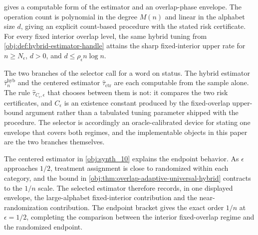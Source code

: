  gives a computable form of the estimator and an overlap-phase envelope. The operation count is polynomial in the degree \(M(n)\) and linear in the alphabet size \(d\), giving an explicit count-based procedure with the stated risk certificate. For every fixed interior overlap level, the same hybrid tuning from \cref{obj:def:hybrid-estimator-handle} attains the sharp fixed-interior upper rate for \(n\ge N_\epsilon\), \(d>0\), and \(d\le\rho_\epsilon n\log n\).

The two branches of the selector call for a word on status. The hybrid estimator \(\widehat\tau_n^{\mathrm{hyb}}\) and the centered estimator \(\widehat\tau_{\mathrm{ctr}}\) are each computable from the sample alone. The rule \(\widehat\tau_{C_\epsilon,\epsilon}\) that chooses between them is not: it compares the two risk certificates, and \(C_\epsilon\) is an existence constant produced by the fixed-overlap upper-bound argument rather than a tabulated tuning parameter shipped with the procedure. The selector is accordingly an oracle-calibrated device for stating one envelope that covers both regimes, and the implementable objects in this paper are the two branches themselves.

The centered estimator in \cref{obj:synth_10} explains the endpoint behavior. As \(\epsilon\) approaches \(1/2\), treatment assignment is close to randomized within each category, and the bound in \cref{obj:thm:overlap-adaptive-universal-hybrid} contracts to the \(1/n\) scale. The selected estimator therefore records, in one displayed envelope, the large-alphabet fixed-interior contribution and the near-randomization contribution. The endpoint bracket gives the exact order \(1/n\) at \(\epsilon=1/2\), completing the comparison between the interior fixed-overlap regime and the randomized endpoint.
